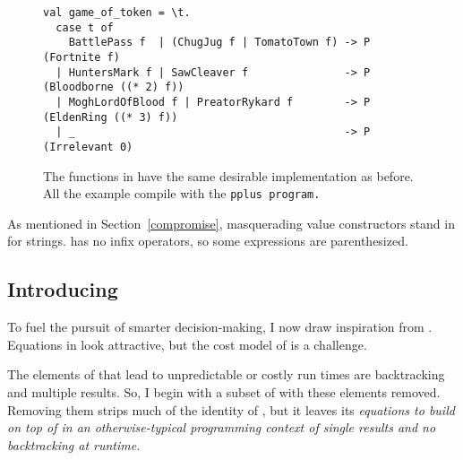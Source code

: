 \documentclass[manuscript,screen,review, 12pt, nonacm]{acmart}
\begin{document}
\begin{figure}[ht]
\begin{minipage}[h]{0.5\linewidth}
\begin{lstlisting}[numbers=none, basicstyle=\tiny, xleftmargin=2em,
                      frame=single]
   \end{lstlisting}
            \label{fig:pptriplelookup} 
        \vspace{4ex}
      \end{minipage} 
      \begin{minipage}[h]{\linewidth}
        \pplst 
        \begin{lstlisting}[numbers=none, basicstyle=\tiny, xleftmargin=9em,
          showstringspaces=false,
          frame=single]
val game_of_token = \t. 
  case t of  
    BattlePass f  | (ChugJug f | TomatoTown f) -> P (Fortnite f)
  | HuntersMark f | SawCleaver f               -> P (Bloodborne ((* 2) f))
  | MoghLordOfBlood f | PreatorRykard f        -> P (EldenRing ((* 3) f))
  | _                                          -> P (Irrelevant 0)
\end{lstlisting}
          \label{fig:ppgot}
      \vspace{4ex}
      \end{minipage}%
      \caption{The functions in \PPlus have the same desirable implementation as
      before. All the example compile with the \tt{pplus} program.}
  \label{fig:ppfuncs}
    \end{figure}        
    
    As mentioned in Section~\ref{compromise}, masquerading value constructors
    stand in for strings. \PPlus has no infix operators, so some expressions are
    parenthesized. 


\subsection{Introducing \VMinus }
\label{vminus}

        To fuel the pursuit of smarter decision-making, I now draw inspiration
        from \VC. Equations in \VC look attractive, but the cost model of \VC is
        a challenge. 
        
        The elements of \VC that lead to unpredictable or costly run times are
        backtracking and multiple results. So, I begin with a subset of \VC with
        these elements removed. Removing them strips much of the identity of
        \VC, but it leaves its \it{equations} to build on top of in an
        otherwise-typical programming context of single results and no
        backtracking at runtime. 
        
\end{document}

